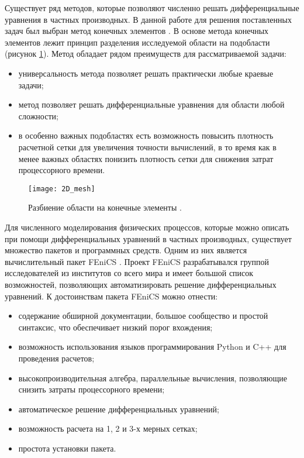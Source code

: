 Существует ряд методов, которые позволяют численно решать дифференциальные уравнения в частных производных. В данной 
работе для решения поставленных задач был выбран метод конечных элементов \cite{mke}. В основе метода конечных 
элементов лежит принцип разделения исследуемой области на подобласти (рисунок \ref{fig_mesh}). Метод обладает рядом 
преимуществ для рассматриваемой задачи:

\begin{itemize}
	\item универсальность метода позволяет решать практически любые краевые задачи;
	\item метод позволяет решать дифференциальные уравнения для области любой сложности;
	\item в особенно важных подобластях есть возможность повысить плотность расчетной сетки для увеличения точности 
		вычислений, в то время как в менее важных областях понизить плотность сетки для снижения затрат процессорного 
		времени. 
\end{itemize}

\begin{figure}[ht]
\centering
	\texttt{[image: 2D\_mesh]}
	\captionsetup{justification=centering}
    \caption{Разбиение области на конечные элементы \cite{wiki_mke_fig}.}
    \label{fig_mesh}
\end{figure}


Для численного моделирования физических процессов, которые можно описать при помощи дифференциальных уравнений в 
частных производных, существует множество пакетов и программных средств. Одним из них является вычислительный пакет 
FEniCS \cite{fenics_tut1}. Проект FEniCS разрабатывался группой исследователей из институтов со всего мира и имеет 
большой список возможностей, позволяющих автоматизировать решение дифференциальных уравнений. К достоинствам пакета 
FEniCS можно отнести:

\begin{itemize}
	\item содержание обширной документации, большое сообщество и простой синтаксис, что обеспечивает низкий порог 
		вхождения;
	\item возможность использования языков программирования Python и C++ для проведения расчетов;
	\item высокопроизводительная алгебра, параллельные вычисления, позволяющие снизить затраты процессорного времени; 
	\item автоматическое решение дифференциальных уравнений;
	\item возможность расчета на 1, 2 и 3-х мерных сетках;
	\item простота установки пакета.
\end{itemize} 

